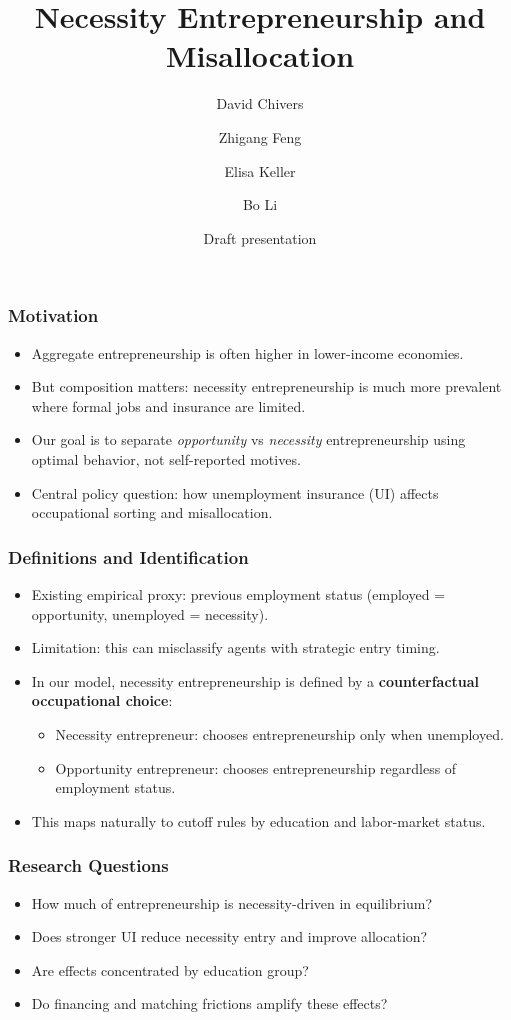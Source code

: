 ﻿\documentclass[english,aspectratio=169]{beamer}
\title{Necessity Entrepreneurship and Misallocation}
\author[Chivers, Feng, Keller, Li]{David Chivers \and Zhigang Feng \and Elisa Keller \and Bo Li}
\institute{Durham University \and University of Nebraska Omaha \and University of Exeter \and Peking University}
\date{Draft presentation}
\begin{document}
\begin{frame}
\titlepage
\end{frame}

\begin{frame}
\frametitle{Motivation}
\begin{itemize}
\item Aggregate entrepreneurship is often higher in lower-income economies.
\item But composition matters: necessity entrepreneurship is much more prevalent where formal jobs and insurance are limited.
\item Our goal is to separate \textit{opportunity} vs \textit{necessity} entrepreneurship using optimal behavior, not self-reported motives.
\item Central policy question: how unemployment insurance (UI) affects occupational sorting and misallocation.
\end{itemize}
\end{frame}

\begin{frame}
\frametitle{Definitions and Identification}
\begin{itemize}
\item Existing empirical proxy: previous employment status (employed = opportunity, unemployed = necessity).
\item Limitation: this can misclassify agents with strategic entry timing.
\item In our model, necessity entrepreneurship is defined by a \textbf{counterfactual occupational choice}:
\begin{itemize}
\item Necessity entrepreneur: chooses entrepreneurship only when unemployed.
\item Opportunity entrepreneur: chooses entrepreneurship regardless of employment status.
\end{itemize}
\item This maps naturally to cutoff rules by education and labor-market status.
\end{itemize}
\end{frame}

\begin{frame}
\frametitle{Research Questions}
\begin{itemize}
\item How much of entrepreneurship is necessity-driven in equilibrium?
\item Does stronger UI reduce necessity entry and improve allocation?
\item Are effects concentrated by education group?
\item Do financing and matching frictions amplify these effects?
\end{itemize}
\end{frame}
\end{document}
